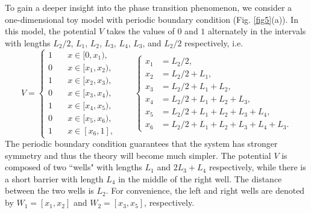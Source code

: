 \documentclass[a4paper,11pt]{article}
\begin{document}
To gain a deeper insight into the phase transition phenomenon, we consider a one-dimensional toy model with periodic boundary condition (Fig. \ref{fig5}(a)). In this model, the potential $V$ takes the values of $0$ and $1$ alternately in the intervals with lengths $L_2/2$, $L_1$, $L_2$, $L_3$, $L_4$, $L_3$, and $ L_2/2$ respectively, i.e.
\begin{equation*}
V = \left\{
\begin{split}
1 & \quad x \in [0, x_1), \\
0 & \quad x \in [x_1, x_2), \\
1 & \quad x \in [x_2, x_3), \\
0 & \quad x \in [x_3, x_4), \\
1 & \quad x \in [x_4, x_5), \\
0 & \quad x \in [x_5, x_6), \\
1 & \quad x \in [x_6, 1],
\end{split}
\right.
\qquad
\left\{
\begin{split}
x_1 & = L_2/2, \\
x_2 & = L_2/2 + L_1, \\
x_3 & = L_2/2 + L_1 + L_2, \\
x_4 & = L_2/2 + L_1 + L_2 + L_3, \\
x_5 & = L_2/2 + L_1 + L_2 + L_3 + L_4, \\
x_6 & = L_2/2 + L_1 + L_2 + L_3 + L_4 + L_3.
\end{split}
\right.
\end{equation*}
The periodic boundary condition guarantees that the system has stronger symmetry and thus the theory will become much simpler. The potential $V$ is composed of two ``wells" with lengths $L_1$ and $2L_3+L_4$ respectively, while there is a short barrier with length $L_4$ in the middle of the right well. The distance between the two wells is $L_2$. For convenience, the left and right wells are denoted by $W_1 = [x_1, x_2]$ and $W_2 = [x_3, x_5]$, respectively.
\end{document}
